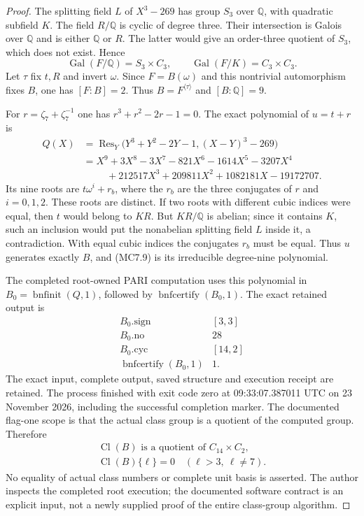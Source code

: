 \begin{proof}
The splitting field $L$ of $X^3-269$ has group $S_3$ over
$\mathbb Q$, with quadratic subfield $K$.
The field $R/\mathbb Q$ is cyclic of degree three.
Their intersection is Galois over $\mathbb Q$ and is either
$\mathbb Q$ or $R$.  The latter would give an order-three
quotient of $S_3$, which does not exist.  Hence
\[
 \operatorname{Gal}(F/\mathbb Q)=S_3\times C_3,
 \qquad\operatorname{Gal}(F/K)=C_3\times C_3.
 \tag{MC7.8}
\]
Let $\tau$ fix $t,R$ and invert $\omega$.  Since
$F=B(\omega)$ and this nontrivial automorphism fixes $B$,
one has $[F:B]=2$.  Thus $B=F^{\langle\tau\rangle}$
and $[B:\mathbb Q]=9$.

For $r=\zeta_7+\zeta_7^{-1}$ one has
$r^3+r^2-2r-1=0$.  The exact polynomial of $u=t+r$ is
\[
 \begin{split}
 Q(X)&=\operatorname{Res}_Y
          \bigl(Y^3+Y^2-2Y-1,(X-Y)^3-269\bigr)\\
 &=X^9+3X^8-3X^7-821X^6-1614X^5-3207X^4\\
 &\hspace{1cm}+212517X^3+209811X^2+1082181X-19172707.
 \end{split}
 \tag{MC7.9}
\]
Its nine roots are $t\omega^i+r_b$, where the $r_b$ are
the three conjugates of $r$ and $i=0,1,2$.
These roots are distinct.  If two roots with different
cubic indices were equal, then $t$ would belong to $KR$.
But $KR/\mathbb Q$ is abelian; since it contains $K$, such
an inclusion would put the nonabelian splitting field $L$
inside it, a contradiction.  With equal cubic indices the
conjugates $r_b$ must be equal.  Thus $u$ generates exactly
$B$, and (MC7.9) is its irreducible degree-nine polynomial.

The completed root-owned PARI computation uses this polynomial
in $B_0=\operatorname{bnfinit}(Q,1)$, followed by
$\operatorname{bnfcertify}(B_0,1)$.  The exact retained output is
\[
 \begin{array}{c|c}
 B_0.\mathrm{sign}&[3,3]\\
 B_0.\mathrm{no}&28\\
 B_0.\mathrm{cyc}&[14,2]\\
 \operatorname{bnfcertify}(B_0,1)&1.
 \end{array}
 \tag{MC7.10}
\]
The exact input, complete output, saved structure and execution
receipt are retained.  The process finished with exit code zero
at 09:33:07.387011 UTC on 23 November 2026, including the
successful completion marker.  The documented flag-one scope
is that the actual class group is a quotient of the computed
group.  Therefore
\[
 \begin{gathered}
 \operatorname{Cl}(B)\text{ is a quotient of }C_{14}\times C_2,\\
 \operatorname{Cl}(B)\{\ell\}=0
                         \quad(\ell>3,\ \ell\ne7).
 \end{gathered}
 \tag{MC7.11}
\]
No equality of actual class numbers or complete unit basis is
asserted.  The author inspects the completed root execution;
the documented software contract is an explicit input, not
a newly supplied proof of the entire class-group algorithm.


\end{proof}
